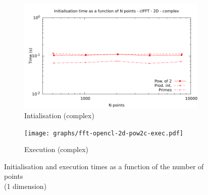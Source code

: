 \documentclass[12pt, a4paper]{article}
\begin{document}
\begin{figure}[H]
\begin{subfigure}{.5\textwidth}
\centering
\includegraphics[width=.9\linewidth]{graphs/fft-opencl-2d-pow2-c-init.pdf}
\caption{Intialisation (complex)}
\label{FFTCL1DCI}
\end{subfigure}%
\begin{subfigure}{.5\textwidth}
\centering
\texttt{[image: graphs/fft-opencl-2d-pow2c-exec.pdf]}
\caption{Execution (complex)}
\label{FFTCL1DCE}
\end{subfigure}
\caption{Initialisation and execution times as a function of the number of points\\(1 dimension)}
\label{FFTCL1D}
\end{figure}
\end{document}

